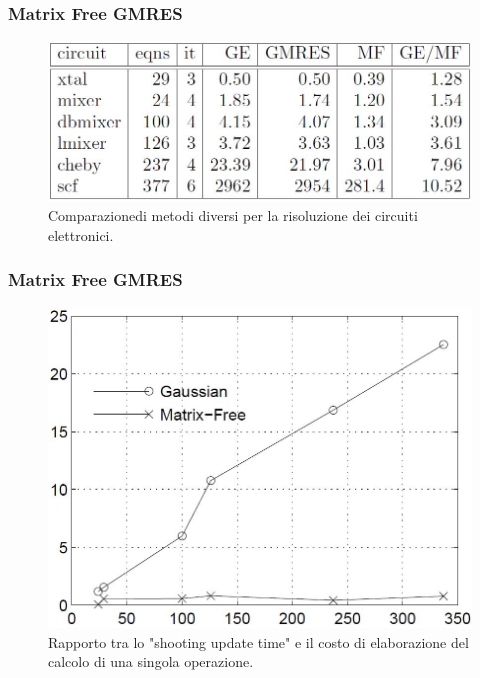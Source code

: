 \documentclass[10pt]{beamer}
\begin{document}
\begin{frame} \frametitle{Matrix Free GMRES}
\begin{figure}
    \centering
    \includegraphics[width=.75\linewidth]{Tabella1.JPG}
    \caption{Comparazione\footnotemark di metodi diversi per la risoluzione dei circuiti elettronici.}
\end{figure}
\end{frame}


\begin{frame} \frametitle{Matrix Free GMRES}
\begin{figure}
    \centering
    \includegraphics[width=.75\linewidth]{Figura1.JPG}
    \caption{Rapporto tra lo "shooting update time" e il costo di elaborazione del calcolo di una singola operazione.}
\end{figure}

\end{frame}
\end{document}
